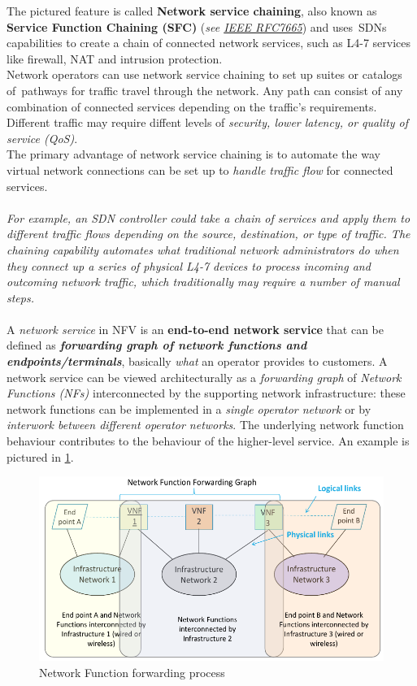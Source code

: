 \documentclass[10pt,a4paper]{report}
\theoremstyle{definition}
\begin{document}
The pictured feature is called \textbf{Network service chaining}, also known as \textbf{Service Function Chaining (SFC)} (\textit{see \href{https://datatracker.ietf.org/doc/pdf/rfc7665.pdf}{IEEE RFC7665}}) and uses SDNs capabilities to create a chain of connected network services, such as L4-7 services like firewall, NAT and intrusion protection.\\
Network operators can use network service chaining to set up suites or catalogs of pathways for traffic travel through the network. Any path can consist of any combination of connected services depending on the traffic’s requirements. Different traffic may require diffent levels of \textit{security, lower latency, or quality of service (QoS)}.\\
The primary advantage of network service chaining is to automate the way virtual network connections can be set up to \textit{handle traffic flow} for connected services. \\\\
\textit{For example, an SDN controller could take a chain of services and apply them to different traffic flows depending on the source, destination, or type of traffic. The chaining capability automates what traditional network administrators do when they connect up a series of physical L4-7 devices to process incoming and outcoming network traffic, which traditionally may require a number of manual steps.}\\\\
A \textit{network service} in NFV is an \textbf{end-to-end network service} that can be defined as  \textit{\textbf{forwarding graph of network functions and endpoints/terminals}}, basically \textit{what} an operator provides to customers.
A network service can be viewed architecturally as a \textit{forwarding graph} of \textit{Network Functions (NFs)} interconnected by the supporting network infrastructure: these network functions can be implemented in a \textit{single operator network} or by \textit{interwork between different operator networks}. The underlying network function behaviour contributes to the behaviour of the higher-level service. An example is pictured in \ref{VNF-eg1}.
\begin{figure}[h]
	\centering\includegraphics[scale=0.50]{images/Pasted image 20230405171050.png}
	\caption{Network Function forwarding process}
\label{VNF-eg1}
\end{figure}
\end{document}
